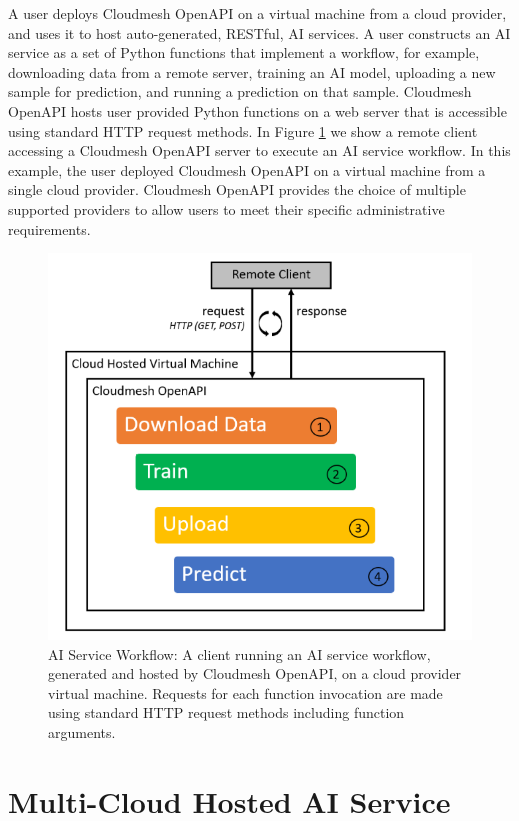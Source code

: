 A user deploys Cloudmesh OpenAPI on a virtual machine from a cloud
provider, and uses it to host auto-generated, RESTful, AI services. A
user constructs an AI service as a set of Python functions that
implement a workflow, for example, downloading data from a remote
server, training an AI model, uploading a new sample for prediction, and
running a prediction on that sample. Cloudmesh OpenAPI hosts user
provided Python functions on a web server that is accessible using
standard HTTP request methods. In Figure \ref{fig:1} we show a remote client
accessing a Cloudmesh OpenAPI server to execute an AI service workflow.
In this example, the user deployed Cloudmesh OpenAPI on a virtual
machine from a single cloud provider. Cloudmesh OpenAPI provides the
choice of multiple supported providers to allow users to meet their
specific administrative requirements.

\begin{figure}[htb]
\centering
\includegraphics[width=\columnwidth]{../images/ai-service-workflow.png}
\caption{AI Service Workflow: A client running an AI service workflow, generated
and hosted by Cloudmesh OpenAPI, on a cloud provider virtual machine.
Requests for each function invocation are made using standard HTTP
request methods including function arguments.
}
\label{fig:1}
\end{figure}


\section{Multi-Cloud Hosted AI
Service}\label{multi-cloud-hosted-ai-service}

